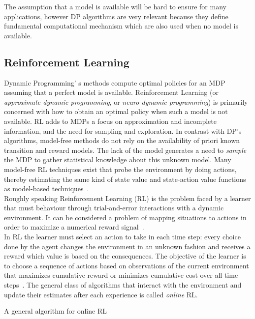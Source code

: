 The assumption that a model is available will be hard to ensure for many applications, however DP algorithms are very relevant because they define fundamental computational mechanism which are also used when no model is available. 

\subsection{Reinforcement Learning}
Dynamic Programming' s methods compute optimal policies for an MDP assuming that a perfect model is available. Reinforcement Learning (or \textit{approximate dynamic programming}, or \textit{neuro-dynamic programming}) is primarily concerned with how to obtain an optimal policy when such a model is not available. RL adds to MDPs a focus on approximation and incomplete information, and the need for sampling and exploration. In contrast with DP's algorithms, model-free methods do not rely on the availability of priori known transition and reward models. The lack of the model generates a need to \textit{sample} the MDP to gather statistical knowledge about this unknown model. Many model-free RL techniques exist that probe the environment by doing actions, thereby estimating the same kind of state value and state-action value functions as model-based techniques~\cite{wiering2012reinforcement}.\\

Roughly speaking Reinforcement Learning (RL) is the problem faced by a learner that must behaviour through trial-and-error interactions with a dynamic environment. It can be considered a problem of mapping situations to actions in order to maximize a numerical reward signal~\cite{RLDef1}. \\

In RL the learner must select an action to take in each time step: every choice done by the agent changes the environment in an unknown fashion and receives a reward which value is based on the consequences. The objective of the learner is to choose a sequence of actions based on observations of the current environment that maximizes cumulative reward or minimizes cumulative cost over all time steps~\cite{LiMalik}. The general class of algorithms that interact with the environment and update their estimates after each experience is called \textit{online} RL.

\begin{algorithm}
	\caption{A general algorithm for online RL~\cite{wiering2012reinforcement}}
\end{algorithm}

